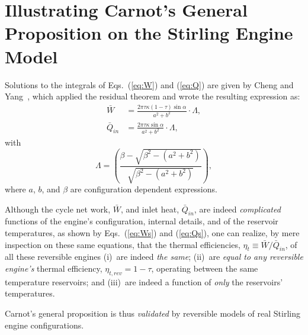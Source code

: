 \section{Illustrating Carnot's General Proposition on the Stirling Engine Model}

    Solutions to the integrals of Eqs.~(\ref{eq:W}) and (\ref{eq:Q})  are  given  by  Cheng  and
    Yang~\cite{2012-ChengCH+YangHS-ApEnergy}, which applied the residual theorem and  wrote  the
    resulting expression as:
    \begin{align}
        \label{eq:Ws}
        \bar{W} &= \frac{2\pi\tau\kappa(1 - \tau)\sin\alpha}{a^2 + b^2}\cdot\Lambda,\\
        \label{eq:Qs}
        \bar{Q}_{in} &= \frac{2\pi\tau\kappa\sin\alpha}{a^2 + b^2}\cdot\Lambda,
    \end{align}
    \noindent with
    \begin{equation}
        \label{eq:Lamda}
        \Lambda = \left(
                \frac{\beta - \sqrt{\beta^2 - (a^2 + b^2)}}{\sqrt{\beta^2 - (a^2 + b^2)}}
            \right),
    \end{equation}
    \noindent where $a$, $b$, and $\beta$ are configuration dependent expressions.

    Although the  cycle  net  work,  $\bar{W}$,  and  inlet  heat,  $\bar{Q}_{in}$,  are  indeed
    \emph{complicated} functions of the engine's configuration, internal  details,  and  of  the
    reservoir temperatures, as shown by Eqs.~(\ref{eq:Ws}) and (\ref{eq:Qs}), one  can  realize,
    by mere inspection on these same equations, that the thermal  efficiencies,  $\eta_t  \equiv
    \bar{W} / \bar{Q}_{in}$, of all these reversible engines  (i)~are  indeed  \emph{the  same};
    (ii)~are \emph{equal to any reversible engine's} thermal efficiency,  $\eta_{t,rev}  =  1  -
    \tau$, operating between the same temperature reservoirs; and (iii)~are indeed a function of
    \emph{only} the reservoirs' temperatures.

    Carnot's general proposition is thus \emph{validated} by reversible models of real  Stirling
    engine configurations.

